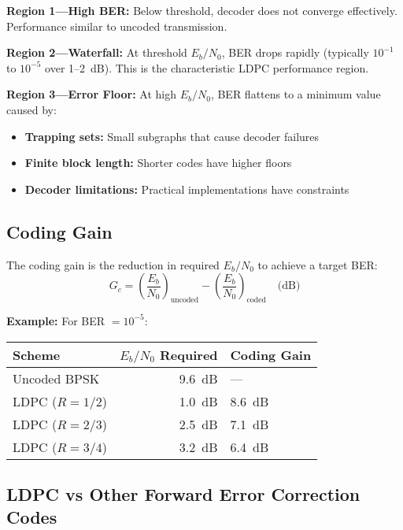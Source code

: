 \textbf{Region 1---High BER:} Below threshold, decoder does not converge effectively. Performance similar to uncoded transmission.

\textbf{Region 2---Waterfall:} At threshold $E_b/N_0$, BER drops rapidly (typically $10^{-1}$ to $10^{-5}$ over 1--2~dB). This is the characteristic LDPC performance region.

\textbf{Region 3---Error Floor:} At high $E_b/N_0$, BER flattens to a minimum value caused by:
\begin{itemize}
\item \textbf{Trapping sets:} Small subgraphs that cause decoder failures
\item \textbf{Finite block length:} Shorter codes have higher floors
\item \textbf{Decoder limitations:} Practical implementations have constraints
\end{itemize}

\subsection{Coding Gain}

The coding gain is the reduction in required $E_b/N_0$ to achieve a target BER:
\begin{equation}
G_c = \left(\frac{E_b}{N_0}\right)_{\text{uncoded}} - \left(\frac{E_b}{N_0}\right)_{\text{coded}} \quad \text{(dB)}
\end{equation}

\textbf{Example:} For BER $= 10^{-5}$:
\begin{center}
\begin{tabular}{@{}lrl@{}}
\toprule
Scheme & $E_b/N_0$ Required & Coding Gain \\
\midrule
Uncoded BPSK & 9.6~dB & --- \\
LDPC ($R=1/2$) & 1.0~dB & 8.6~dB \\
LDPC ($R=2/3$) & 2.5~dB & 7.1~dB \\
LDPC ($R=3/4$) & 3.2~dB & 6.4~dB \\
\bottomrule
\end{tabular}
\end{center}

\subsection{LDPC vs Other Forward Error Correction Codes}

